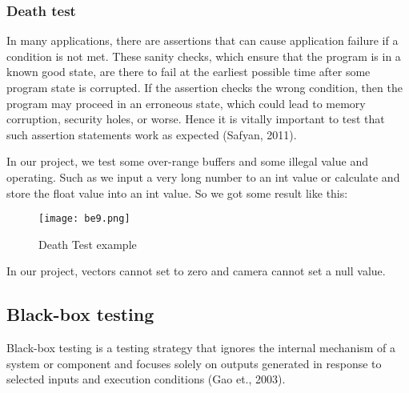 \documentclass[11pt]{article}
\begin{document}
\subsubsection{Death test}
In many applications, there are assertions that can cause application failure if a condition is not met. These sanity checks, which ensure that the program is in a known good state, are there to fail at the earliest possible time after some program state is corrupted. If the assertion checks the wrong condition, then the program may proceed in an erroneous state, which could lead to memory corruption, security holes, or worse. Hence it is vitally important to test that such assertion statements work as expected (Safyan, 2011).

In our project, we test some over-range buffers and some illegal value and operating. Such as we input a very long number to an int value or calculate and store the float value into an int value. So we got some result like this:

\begin{figure}[H]
\centering
\texttt{[image: be9.png]}
\caption{Death Test example}
\label{fig:label}
\end{figure}

In our project, vectors cannot set to zero and camera cannot set a null value.

\subsection{Black-box testing}
Black-box testing is a testing strategy that ignores the internal mechanism of a system or component and focuses solely on outputs generated in response to selected inputs and execution conditions (Gao et., 2003).
\end{document}
